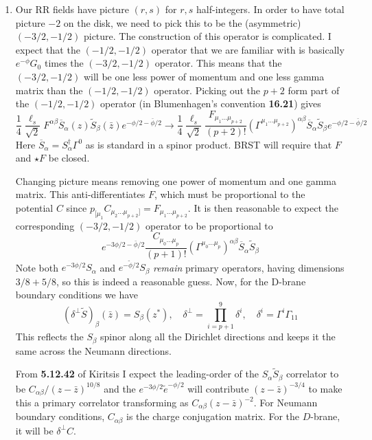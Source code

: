 \documentclass[11pt, class=article, crop=false]{standalone}
\begin{document}
\begin{enumerate}
	\item Our RR fields have picture $(r, s)$ for $r,s$ half-integers. In order to have total picture $-2$ on the disk, we need to pick this to be the (asymmetric) $(-3/2, -1/2)$ picture. The construction of this operator is complicated. I expect that the $(-1/2,-1/2)$ operator that we are familiar with is basically $e^{- \phi} G_0$ times the $(-3/2,-1/2)$ operator. This means that the $(-3/2, -1/2)$ will be one less power of momentum and one less gamma matrix than the $(-1/2, -1/2)$ operator. Picking out the $p+2$ form part of the $(-1/2, -1/2)$ operator (in Blumenhagen's convention \textbf{16.21}) gives
	\[
		\frac14 \frac{\ell_s}{\sqrt 2} 
		F^{\alpha \beta}  \overline{S}_{\alpha}(z) \tilde S_\beta(\bar z) e^{-\phi/2 - \bar \phi/2} 
		\to 
		\frac14 \frac{\ell_s}{\sqrt 2}
		\frac{F_{\mu_1 \dots \mu_{p+2}}}{(p+2)!} (\Gamma^{\mu_1 \dots \mu_{p+2}})^{\alpha \beta} \overline{S}_{\alpha} \tilde S_{\beta} e^{-\phi/2 - \bar \phi/2}
	\]
	Here $\overline S_\alpha = S_\alpha^\dagger \Gamma^0$ as is standard in a spinor product. BRST will require that $F$ and $\star F$ be closed. 
	
	Changing picture means removing one power of momentum and one gamma matrix. This anti-differentiates $F$, which must be proportional to the potential $C$ since $p_{[\mu_1} C_{\mu_2 \dots \mu_{p+2}]} = F_{\mu_1 \dots \mu_{p+2}}$. It is then reasonable to expect the corresponding $(-3/2, -1/2)$ operator to be proportional to
	\[
		 e^{-3\phi/2 - \bar \phi/2} \frac{C_{\mu_0 \dots \mu_{p}}}{(p+1)!} (\Gamma^{\mu_0 \dots \mu_{p}})^{\alpha \beta} \overline{S}_\alpha \tilde S_\beta
	\]
	Note both $e^{-3\phi/2} S_{\alpha}$ and $e^{-\tilde \phi/2} S_{\beta}$ \emph{remain} primary operators, having dimensions $3/8 + 5/8$, so this is indeed a reasonable guess. Now, for the D-brane boundary conditions we have
	\[
		 (\delta^\perp  \tilde S)_\beta(\bar z) = S_\beta(z^*), \quad \delta^\perp = \prod_{i=p+1}^9 \delta^i, \quad \delta^i = \Gamma^i \Gamma_{11}
	\]
	This reflects the $S_\beta$ spinor along all the Dirichlet directions and keeps it the same across the Neumann directions. 
	
	From \textbf{5.12.42} of Kiritsis  I expect the leading-order of the $S_\alpha \tilde S_\beta$ correlator to be $C_{\alpha \beta}/(z - \bar z)^{10/8}$ and the $e^{-3\phi/2} \tilde e^{-\phi/2}$ will contribute $(z-\bar z)^{-3/4}$ to make this a primary correlator transforming as $C_{\alpha \beta} (z - \bar z)^{-2}$. For Neumann boundary conditions, $C_{\alpha \beta}$ is the charge conjugation matrix. For the $D$-brane, it will be $\delta^\perp C$.
	

\end{enumerate}
\end{document}
